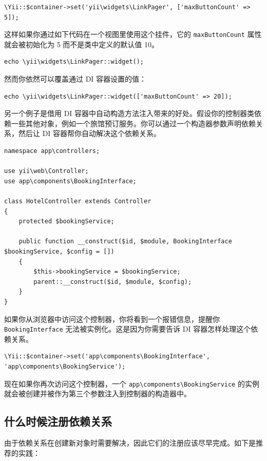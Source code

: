 \lstset{language=php}\begin{lstlisting}
\Yii::$container->set('yii\widgets\LinkPager', ['maxButtonCount' => 5]);
\end{lstlisting}
这样如果你通过如下代码在一个视图里使用这个挂件，它的 \lstinline|maxButtonCount| 属性就会被初始化为 5 而不是类中定义的默认值 10。

\lstset{language=php}\begin{lstlisting}
echo \yii\widgets\LinkPager::widget();
\end{lstlisting}
然而你依然可以覆盖通过 DI 容器设置的值：

\lstset{language=php}\begin{lstlisting}
echo \yii\widgets\LinkPager::widget(['maxButtonCount' => 20]);
\end{lstlisting}
另一个例子是借用 DI 容器中自动构造方法注入带来的好处。假设你的控制器类依赖一些其他对象，例如一个旅馆预订服务。你可以通过一个构造器参数声明依赖关系，然后让 DI 容器帮你自动解决这个依赖关系。

\lstset{language=php}\begin{lstlisting}
namespace app\controllers;

use yii\web\Controller;
use app\components\BookingInterface;

class HotelController extends Controller
{
    protected $bookingService;

    public function __construct($id, $module, BookingInterface $bookingService, $config = [])
    {
        $this->bookingService = $bookingService;
        parent::__construct($id, $module, $config);
    }
}
\end{lstlisting}
如果你从浏览器中访问这个控制器，你将看到一个报错信息，提醒你 \lstinline|BookingInterface| 无法被实例化。这是因为你需要告诉 DI 容器怎样处理这个依赖关系。

\lstset{language=php}\begin{lstlisting}
\Yii::$container->set('app\components\BookingInterface', 'app\components\BookingService');
\end{lstlisting}
现在如果你再次访问这个控制器，一个 \lstinline|app\components\BookingService| 的实例就会被创建并被作为第三个参数注入到控制器的构造器中。

\subsection{什么时候注册依赖关系 \label{concept-di-container.md::when-to-register-dependencies}}
由于依赖关系在创建新对象时需要解决，因此它们的注册应该尽早完成。如下是推荐的实践：

